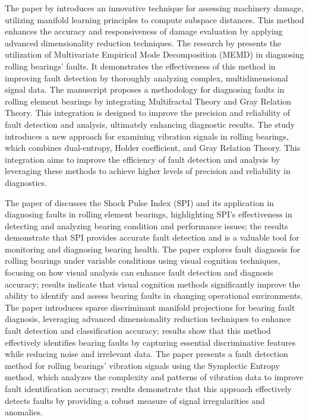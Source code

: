 \documentclass[sn-basic,pdflatex]{sn-jnl}
\theoremstyle{remark}
\theoremstyle{definition}
\begin{document}
The paper by \citep{WOS:000366765500038} introduces an innovative
technique for assessing machinery damage, utilizing manifold learning
principles to compute subspace distances. This method enhances the
accuracy and responsiveness of damage evaluation by applying advanced
dimensionality reduction techniques. The research by
\citep{WOS:000379556300014} presents the utilization of Multivariate
Empirical Mode Decomposition (MEMD) in diagnosing rolling bearings'
faults. It demonstrates the effectiveness of this method in improving
fault detection by thoroughly analyzing complex, multidimensional signal
data. The manuscript proposes a methodology for diagnosing faults in
rolling element bearings by integrating Multifractal Theory and Gray
Relation Theory. This integration is designed to improve the precision
and reliability of fault detection and analysis, ultimately enhancing
diagnostic results\citep{WOS:000391229300006}. The study introduces a
new approach for examining vibration signals in rolling bearings, which
combines dual-entropy, Holder coefficient, and Gray Relation Theory.
This integration aims to improve the efficiency of fault detection and
analysis by leveraging these methods to achieve higher levels of
precision and reliability in diagnostics\citep{WOS:000426819400027}.

The paper of \citep{WOS:000398818700108} discusses the Shock Pulse Index
(SPI) and its application in diagnosing faults in rolling element
bearings, highlighting SPI's effectiveness in detecting and analyzing
bearing condition and performance issues; the results demonstrate that
SPI provides accurate fault detection and is a valuable tool for
monitoring and diagnosing bearing health. The paper explores fault
diagnosis for rolling bearings under variable conditions using visual
cognition techniques, focusing on how visual analysis can enhance fault
detection and diagnosis accuracy; results indicate that visual cognition
methods significantly improve the ability to identify and assess bearing
faults in changing operational environments\citep{WOS:000404415000016}.
The paper \citep{WOS:000401109400020} introduces sparse discriminant
manifold projections for bearing fault diagnosis, leveraging advanced
dimensionality reduction techniques to enhance fault detection and
classification accuracy; results show that this method effectively
identifies bearing faults by capturing essential discriminative features
while reducing noise and irrelevant data. The paper
\citep{WOS:000419006900041} presents a fault detection method for
rolling bearings' vibration signals using the Symplectic Entropy method,
which analyzes the complexity and patterns of vibration data to improve
fault identification accuracy; results demonstrate that this approach
effectively detects faults by providing a robust measure of signal
irregularities and anomalies.
\end{document}
